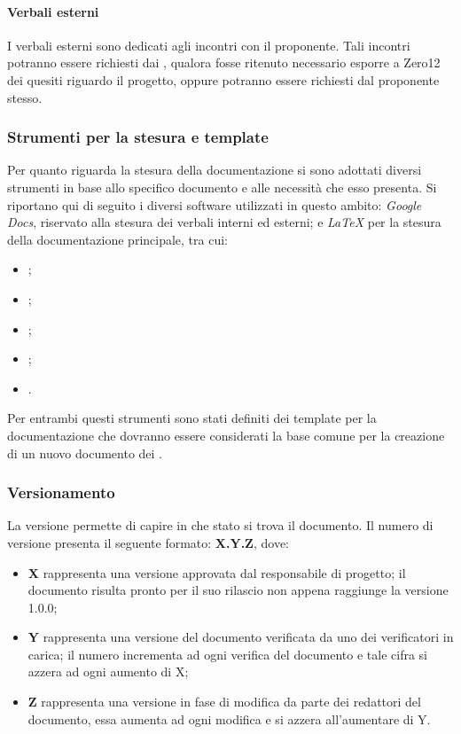 \paragraph{Verbali esterni}
I verbali esterni sono dedicati agli incontri con il proponente.
Tali incontri potranno essere richiesti dai \groupName{}, qualora fosse ritenuto necessario esporre a Zero12 dei quesiti riguardo il progetto, oppure potranno essere richiesti dal proponente stesso.

\subsubsection{Strumenti per la stesura e template}
Per quanto riguarda la stesura della documentazione si sono adottati diversi strumenti in base allo specifico documento e alle necessità che esso presenta. 
Si riportano qui di seguito i diversi software utilizzati in
questo ambito: \textit{Google Docs}\glo{}, riservato alla stesura dei verbali interni ed esterni; e \textit{LaTeX}\glo{} per la
stesura della documentazione principale, tra cui: 
\begin{itemize}
\item \docNameNdP{};
\item \docNamePdP{};
\item \docNameAdR{};
\item \docNamePdQ{};
\item \docNameGlo{}.
\end{itemize}
Per entrambi questi strumenti sono stati definiti dei
template per la documentazione che dovranno essere considerati la base comune per la creazione di un nuovo documento dei \groupName{}.

\subsubsection{Versionamento}
La versione permette di capire in che stato si trova il documento. Il numero di versione presenta il seguente formato: \textbf{X.Y.Z}, dove:
\begin{itemize}
    \item \textbf{X} rappresenta una versione approvata dal 
    responsabile di 	progetto; il documento risulta pronto per il 
    suo rilascio non appena raggiunge la versione 1.0.0;
    \item \textbf{Y} rappresenta una versione del documento 
    verificata da uno dei verificatori in carica; il numero 
    incrementa ad ogni verifica del documento e tale cifra si
    azzera ad ogni aumento di X;
    \item \textbf{Z} rappresenta una versione in fase di modifica
    da parte dei redattori del documento, essa aumenta ad ogni 
    modifica e si azzera all’aumentare di Y.
\end{itemize}

